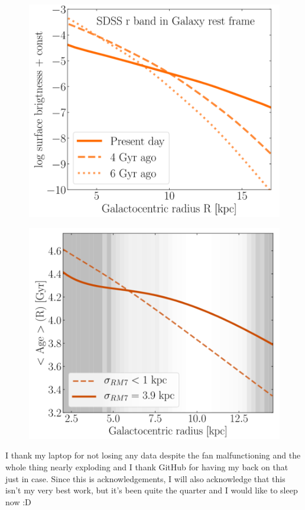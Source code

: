 \documentclass[preprint2]{aastex631}
\begin{document}
\begin{figure}[htb]
    \centering
    \includegraphics[width=\columnwidth]{frankel2019_fig9.png}
    \caption{}
\end{figure}

\begin{figure}[htb]
    \centering
    \includegraphics[width=\columnwidth]{frankel2019_fig12.png}
    \caption{}
\end{figure}

\begin{acknowledgements}
    I thank my laptop for not losing any data despite the fan malfunctioning and the whole thing nearly exploding and I thank GitHub for having my back on that just in case. Since this is acknowledgements, I will also acknowledge that this isn't my very best work, but it's been quite the quarter and I would like to sleep now :D
\end{acknowledgements}


{}
\end{document}
